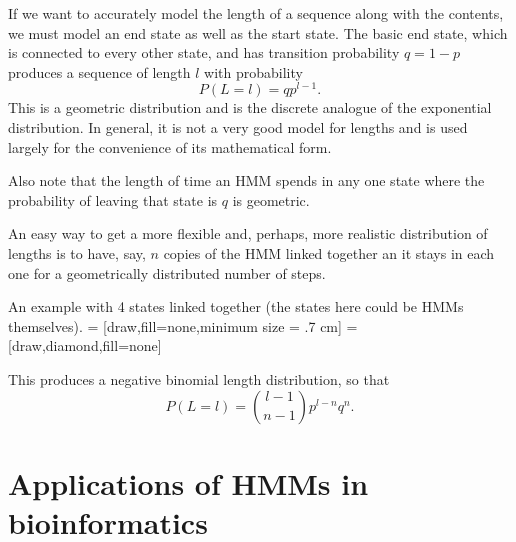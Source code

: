\documentclass[11pt]{article}
\begin{document}
If we want to accurately model the length of a sequence along with the contents, we  must model an end state as well as the start state.  The basic end state, which is connected to every other state, and has transition probability $q = 1-p$ produces a sequence of length $l$ with probability
\[ P(L = l) = qp^{l-1}. \]
This is a geometric distribution and is the discrete analogue of the exponential distribution.  In general, it is not a very good model for lengths and is used largely for the convenience of its mathematical form.

Also note that the length of time an HMM spends in any one state where the probability of leaving that state is $q$ is geometric.


An easy way to get a more flexible and, perhaps, more realistic distribution of lengths is to have, say, $n$ copies of the HMM linked together  an it stays in each one for a geometrically distributed number of steps.  

An example with 4 states linked together (the states here could be HMMs themselves).
 = [draw,fill=none,minimum size = .7 cm]
 = [draw,diamond,fill=none]





This produces a negative binomial length distribution, so that 
\[ P(L = l) = {l-1 \choose n-1} p^{l-n}q^n. \]



\section{Applications of HMMs in bioinformatics}
\label{sec:HMMapplication}
\end{document}
